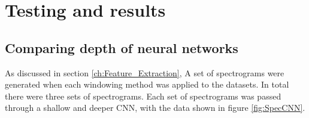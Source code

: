 \documentclass[class=report,11pt,crop=false]{standalone}
\begin{document}
\ifstandalone
\tableofcontents
\fi
\section{Testing and results \label{ch:T_R}}







\subsection{Comparing depth of neural networks}

As discussed in section \ref{ch:Feature_Extraction}, A set of spectrograms were generated when each windowing method was applied to the datasets. In total there were three sets of spectrograms. Each set of spectrograms was passed through a shallow and deeper CNN, with the data shown in figure \ref{fig:SpecCNN}.
\end{document}
